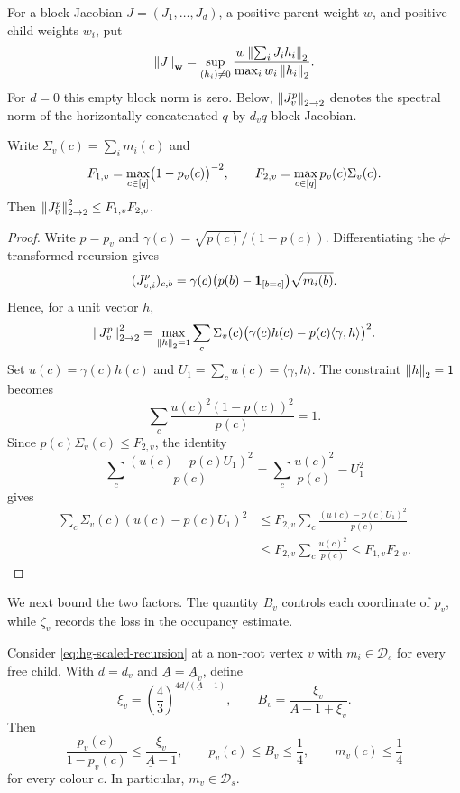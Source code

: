 For a block Jacobian \(J=(J_1,\ldots,J_d)\), a positive parent weight
\(w\), and positive child weights \(w_i\), put
\begin{equation}
 \left\|J\right\|_{\mathbf w}
 =\sup_{(h_i)\ne0}
   \frac{w\left\|\sum_iJ_ih_i\right\|_2}
        {\max_i w_i\left\|h_i\right\|_2}.
 \label{eq:hg-weighted-norm}
\end{equation}
For \(d=0\) this empty block norm is zero.
Below, \(\left\|J^p_v\right\|_{2\to2}\) denotes the spectral norm of the horizontally
concatenated \(q\)-by-\(d_vq\) block Jacobian.

\begin{lemma}\label{lem:hg-jacobian-factor}
Write \(\Sigma_v(c)=\sum_i m_i(c)\) and
\[
  F_{1,v}=\max_{c\in[q]}\bigl(1-p_v(c)\bigr)^{-2},
  \qquad
  F_{2,v}=\max_{c\in[q]}p_v(c)\Sigma_v(c).
\]
Then \(\left\|J^p_v\right\|_{2\to2}^2\le F_{1,v}F_{2,v}\).
\end{lemma}

\begin{proof}
Write \(p=p_v\) and \(\gamma(c)=\sqrt{p(c)}/(1-p(c))\).
Differentiating the \(\phi\)-transformed recursion gives
\[
  (J^p_{v,i})_{c,b}
   =\gamma(c)\bigl(p(b)-\mathbf{1}_{\left[b=c\right]}\bigr)\sqrt{m_i(b)}.
\]
Hence, for a unit vector \(h\),
\[
  \left\|J^p_v\right\|_{2\to2}^2
   =\max_{\left\|h\right\|_2=1}\sum_c\Sigma_v(c)
      \bigl(\gamma(c)h(c)-p(c)\langle\gamma,h\rangle\bigr)^2 .
\]
Set \(u(c)=\gamma(c)h(c)\) and
\(U_1=\sum_cu(c)=\langle\gamma,h\rangle\).  The constraint
\(\left\|h\right\|_2=1\) becomes
\[
  \sum_c\frac{u(c)^2(1-p(c))^2}{p(c)}=1.
\]
Since \(p(c)\Sigma_v(c)\le F_{2,v}\), the identity
\[
  \sum_c\frac{(u(c)-p(c)U_1)^2}{p(c)}
  =\sum_c\frac{u(c)^2}{p(c)}-U_1^2
\]
gives
\[
\begin{aligned}
 \sum_c\Sigma_v(c)(u(c)-p(c)U_1)^2
 &\le F_{2,v}\sum_c\frac{(u(c)-p(c)U_1)^2}{p(c)}\\
 &\le F_{2,v}\sum_c\frac{u(c)^2}{p(c)}
 \le F_{1,v}F_{2,v}.
\end{aligned}
\]
\end{proof}

We next bound the two factors.  The quantity \(B_v\) controls each
coordinate of \(p_v\), while \(\zeta_v\) records the loss in the occupancy
estimate.

\begin{lemma}
\label{lem:hg-continuous-marginal}
Consider \eqref{eq:hg-scaled-recursion} at a non-root vertex \(v\) with
$m_i\in\mathcal D_s$ for every free child.  With $d=d_v$ and
\(\underline A=\underline A_v\), define
\begin{equation}
  \xi_v=\left(\frac43\right)^{4d/(\underline A-1)},
  \qquad
  B_v=\frac{\xi_v}{\underline A-1+\xi_v}.
  \label{eq:hg-xi-B}
\end{equation}
Then
\begin{equation}
  \frac{p_v(c)}{1-p_v(c)}
    \le\frac{\xi_v}{\underline A-1},
  \qquad p_v(c)\le B_v\le\frac14,
  \qquad m_v(c)\le\frac14
  \label{eq:hg-marginal-bound}
\end{equation}
for every colour $c$.  In particular,
\(m_v\in\mathcal D_s\).
\end{lemma}


